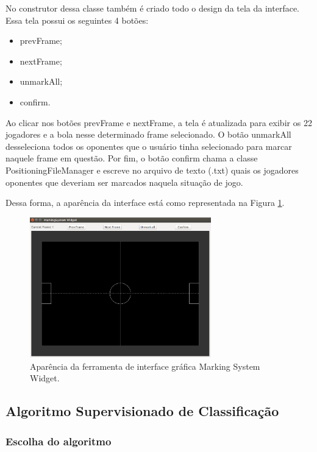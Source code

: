\documentclass[a4paper,12pt]{article}
\begin{document}
No construtor dessa classe também é criado todo o design da tela da interface. Essa tela possui os seguintes 4 botões:
\begin{itemize}
\item prevFrame;
\item nextFrame;
\item unmarkAll;
\item confirm.
\end{itemize}

Ao clicar nos botões prevFrame e nextFrame, a tela é atualizada para exibir os 22 jogadores e a bola nesse determinado frame selecionado. O botão unmarkAll desseleciona todos os oponentes que o usuário tinha selecionado para marcar naquele frame em questão. Por fim, o botão confirm chama a classe PositioningFileManager e escreve no arquivo de texto (.txt) quais os jogadores oponentes que deveriam ser marcados naquela situação de jogo.

Dessa forma, a aparência da interface está como representada na Figura \ref{fig:ms-widget}.

\begin{figure}[H]
	\centering
	\includegraphics[width=0.7\textwidth]{figures/ms-widget.png}
   \caption{Aparência da ferramenta de interface gráfica Marking System Widget.} \label{fig:ms-widget}
\end{figure}

\subsection{Algoritmo Supervisionado de Classificação}

\subsubsection{Escolha do algoritmo}
\end{document}
